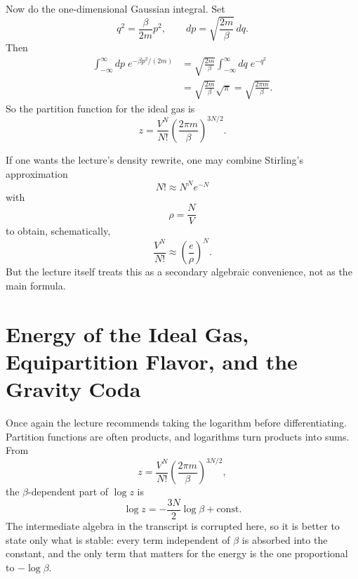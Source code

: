 Now do the one-dimensional Gaussian integral. Set
\begin{equation}
q^2=\frac{\beta}{2m}p^2,
\qquad
dp=\sqrt{\frac{2m}{\beta}}\,dq.
\end{equation}
Then
\begin{align}
\int_{-\infty}^{\infty}dp\;e^{-\beta p^2/(2m)}
&=
\sqrt{\frac{2m}{\beta}}
\int_{-\infty}^{\infty}dq\;e^{-q^2} \\
&=
\sqrt{\frac{2m}{\beta}}\sqrt{\pi}
=
\sqrt{\frac{2\pi m}{\beta}}.
\end{align}
So the partition function for the ideal gas is
\begin{equation}
z=\frac{V^N}{N!}\left(\frac{2\pi m}{\beta}\right)^{3N/2}.
\end{equation}

If one wants the lecture's density rewrite, one may combine Stirling's approximation
\begin{equation}
N!\approx N^N e^{-N}
\end{equation}
with
\begin{equation}
\rho=\frac{N}{V}
\end{equation}
to obtain, schematically,
\begin{equation}
\frac{V^N}{N!}\approx \left(\frac{e}{\rho}\right)^N.
\end{equation}
But the lecture itself treats this as a secondary algebraic convenience, not as the main formula.

\section{Energy of the Ideal Gas, Equipartition Flavor, and the Gravity Coda}

Once again the lecture recommends taking the logarithm before differentiating. Partition functions are often products, and logarithms turn products into sums. From
\begin{equation}
z=\frac{V^N}{N!}\left(\frac{2\pi m}{\beta}\right)^{3N/2},
\end{equation}
the \(\beta\)-dependent part of \(\log z\) is
\begin{equation}
\log z=-\frac{3N}{2}\log\beta+\mathrm{const}.
\end{equation}
The intermediate algebra in the transcript is corrupted here, so it is better to state only what is stable: every term independent of \(\beta\) is absorbed into the constant, and the only term that matters for the energy is the one proportional to \(-\log\beta\).


